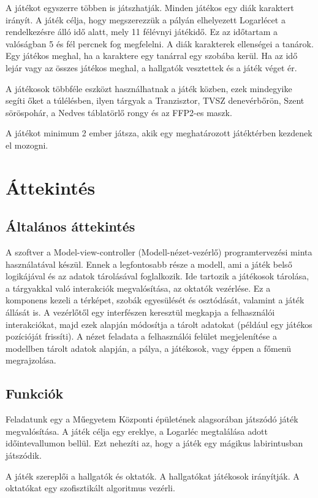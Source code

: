 A játékot egyszerre többen is játszhatják. Minden játékos egy diák karaktert irányít. A játék célja, hogy megszerezzük a pályán elhelyezett Logarlécet a rendelkezésre álló idő alatt, mely 11 félévnyi játékidő. Ez az időtartam a valóságban 5 és fél percnek fog megfelelni. A diák karakterek ellenségei a tanárok. Egy játékos meghal, ha a karaktere egy tanárral egy szobába kerül. Ha az idő lejár vagy az összes játékos meghal, a hallgatók vesztettek és a játék véget ér.

A játékosok többféle eszközt használhatnak a játék közben, ezek mindegyike segíti őket a túlélésben, ilyen tárgyak a Tranzisztor, TVSZ denevérbőrön, Szent söröspohár, a Nedves táblatörlő rongy és az FFP2-es maszk.

A játékot minimum 2 ember játsza, akik egy meghatározott játéktérben kezdenek el mozogni.
\section{Áttekintés}
\subsection{Általános áttekintés}

A szoftver a Model-view-controller (Modell-nézet-vezérlő) programtervezési minta használatával készül. Ennek a legfontosabb része a modell, ami a játék belső logikájával és az adatok tárolásával foglalkozik. Ide tartozik a játékosok tárolása, a tárgyakkal való interakciók megvalósítása, az oktatók vezérlése. Ez a komponens kezeli a térképet, szobák egyesülését és osztódását, valamint a játék állását is. A vezérlőtől egy interfészen keresztül megkapja a felhasználói interakciókat, majd ezek alapján módosítja a tárolt adatokat (például egy játékos pozícióját frissíti). A nézet feladata a felhasználói felület megjelenítése a modellben tárolt adatok alapján, a pálya, a játékosok, vagy éppen a főmenü megrajzolása.

\subsection{Funkciók}

Feladatunk egy a Műegyetem Központi épületének alagsorában játszódó játék megvalósítása. A játék célja egy ereklye, a Logarléc megtalálása adott időintevallumon bellül. Ezt nehezíti az, hogy a játék egy mágikus labirintusban játszódik.

A játék szereplői a hallgatók és oktatók. A hallgatókat játékosok irányítják. A oktatókat egy szofisztikált algoritmus vezérli.

